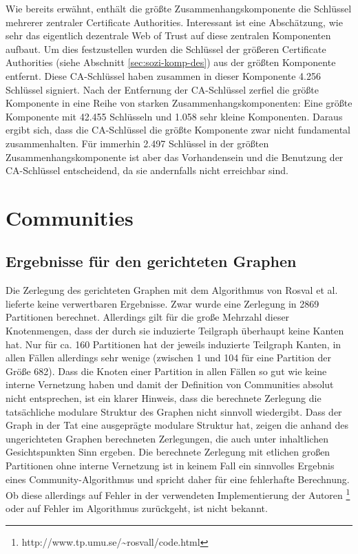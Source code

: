 Wie bereits erwähnt, enthält die größte Zusammenhangskomponente
die Schlüssel mehrerer zentraler Certificate
Authorities. Interessant ist eine Abschätzung, wie sehr das
eigentlich dezentrale Web of Trust auf diese zentralen Komponenten
aufbaut. Um dies festzustellen wurden die Schlüssel der größeren
Certificate Authorities (siehe Abschnitt \ref{sec:sozi-komp-des}) aus
der größten Komponente entfernt. Diese CA-Schlüssel haben
zusammen in dieser Komponente 4.256 Schlüssel signiert. Nach der
Entfernung der CA-Schlüssel zerfiel die größte Komponente in eine
Reihe von starken Zusammenhangskomponenten: Eine größte Komponente
mit 42.455 Schlüsseln und 1.058 sehr kleine Komponenten. Daraus ergibt
sich, dass die CA-Schlüssel die größte Komponente zwar nicht
fundamental zusammenhalten. Für immerhin 2.497 Schlüssel in der
größten Zusammenhangskomponente ist aber das Vorhandensein und die
Benutzung der CA-Schlüssel entscheidend, da sie andernfalls nicht
erreichbar sind.

\section{Communities}
\label{sec:result-zusamm-und-comm}

\subsection{Ergebnisse für den gerichteten Graphen}
\label{sec:ergebnisse-fur-den}

Die Zerlegung des gerichteten Graphen mit dem Algorithmus von Rosval
et al. lieferte keine verwertbaren Ergebnisse. Zwar wurde eine
Zerlegung in 2869 Partitionen berechnet. Allerdings gilt für die
große Mehrzahl dieser Knotenmengen, dass der durch sie induzierte
Teilgraph überhaupt keine Kanten hat. Nur für ca. 160 Partitionen
hat der jeweils induzierte Teilgraph Kanten, in allen Fällen
allerdings sehr wenige (zwischen 1 und 104 für eine Partition der
Größe 682). Dass die Knoten einer Partition in allen Fällen so
gut wie keine interne Vernetzung haben und damit der Definition von
Communities absolut nicht entsprechen, ist ein klarer Hinweis, dass
die berechnete Zerlegung die tatsächliche modulare Struktur des
Graphen nicht sinnvoll wiedergibt. Dass der Graph in der Tat eine
ausgeprägte modulare Struktur hat, zeigen die anhand des
ungerichteten Graphen berechneten Zerlegungen, die auch unter
inhaltlichen Gesichtspunkten Sinn ergeben.  Die berechnete Zerlegung mit etlichen
großen Partitionen ohne interne Vernetzung ist in keinem Fall ein
sinnvolles Ergebnis eines Community-Algorithmus und spricht daher
für eine fehlerhafte Berechnung. Ob diese allerdings auf Fehler in
der verwendeten Implementierung der Autoren
\footnote{http://www.tp.umu.se/\~{}rosvall/code.html} oder auf Fehler im
Algorithmus zurückgeht, ist nicht bekannt.

